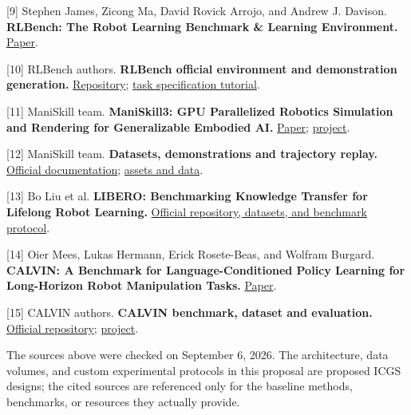 \documentclass[
  10pt,
]{article}
\begin{document}
{[}9{]} Stephen James, Zicong Ma, David Rovick Arrojo, and Andrew J. Davison. \textbf{RLBench: The Robot Learning Benchmark \& Learning Environment.} \href{https://arxiv.org/abs/1909.12271}{Paper}.

{[}10{]} RLBench authors. \textbf{RLBench official environment and demonstration generation.} \href{https://github.com/stepjam/RLBench}{Repository}; \href{https://github.com/stepjam/RLBench/blob/master/tutorials/simple_task.md}{task specification tutorial}.

{[}11{]} ManiSkill team. \textbf{ManiSkill3: GPU Parallelized Robotics Simulation and Rendering for Generalizable Embodied AI.} \href{https://arxiv.org/abs/2410.00425}{Paper}; \href{https://www.maniskill.ai/}{project}.

{[}12{]} ManiSkill team. \textbf{Datasets, demonstrations and trajectory replay.} \href{https://maniskill.readthedocs.io/en/latest/user_guide/datasets/index.html}{Official documentation}; \href{https://huggingface.co/datasets/haosulab/ManiSkill}{assets and data}.

{[}13{]} Bo Liu et al. \textbf{LIBERO: Benchmarking Knowledge Transfer for Lifelong Robot Learning.} \href{https://github.com/Lifelong-Robot-Learning/LIBERO}{Official repository, datasets, and benchmark protocol}.

{[}14{]} Oier Mees, Lukas Hermann, Erick Rosete-Beas, and Wolfram Burgard. \textbf{CALVIN: A Benchmark for Language-Conditioned Policy Learning for Long-Horizon Robot Manipulation Tasks.} \href{https://arxiv.org/abs/2112.03227}{Paper}.

{[}15{]} CALVIN authors. \textbf{CALVIN benchmark, dataset and evaluation.} \href{https://github.com/mees/calvin}{Official repository}; \href{https://calvin.cs.uni-freiburg.de/}{project}.

The sources above were checked on September 6, 2026. The architecture, data volumes, and custom experimental protocols in this proposal are proposed ICGS designs; the cited sources are referenced only for the baseline methods, benchmarks, or resources they actually provide.
\end{document}
